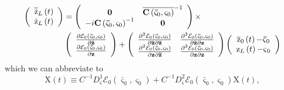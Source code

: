 \documentclass[aps,preprint]{revtex4}%
\begin{document}
\begin{align}
\left(
\begin{array}
[c]{c}%
\overline{\mathrm{\dot{z}}}_{L}\left(  t\right)  \\
\mathrm{\dot{z}}_{L}\left(  t\right)
\end{array}
\right)    & =\left(
\begin{array}
[c]{cc}%
\mathbf{0} & \overline{\mathbf{C}\left(  \mathbf{\bar{\varsigma}}%
_{0},\mathbf{\varsigma}_{0}\right)  }^{-1}\\
-i\mathbf{C}\left(  \mathbf{\bar{\varsigma}}_{0},\mathbf{\varsigma}%
_{0}\right)  ^{-1} & \mathbf{0}%
\end{array}
\right)  \times\nonumber\\
& \left(
\begin{array}
[c]{c}%
\frac{\partial\mathcal{E}_{0}\left(  \mathbf{\bar{\varsigma}}_{0}%
,\mathbf{\varsigma}_{0}\right)  }{\partial\mathbf{\bar{z}}}\\
\frac{\partial\mathcal{E}_{0}\left(  \mathbf{\bar{\varsigma}}_{0}%
,\mathbf{\varsigma}_{0}\right)  }{\partial\mathbf{z}}%
\end{array}
\right)  +\left(
\begin{array}
[c]{cc}%
\frac{\partial^{2}\mathcal{E}_{0}\left(  \mathbf{\bar{\varsigma}}%
_{0},\mathbf{\varsigma}_{0}\right)  }{\partial\mathbf{\bar{z}}\partial
\mathbf{\bar{z}}} & \frac{\partial^{2}\mathcal{E}_{0}\left(  \mathbf{\bar
{\varsigma}}_{0},\mathbf{\varsigma}_{0}\right)  }{\partial\mathbf{\bar{z}%
}\partial\mathbf{z}}\\
\frac{\partial^{2}\mathcal{E}_{0}\left(  \mathbf{\bar{\varsigma}}%
_{0},\mathbf{\varsigma}_{0}\right)  }{\partial\mathbf{z}\partial
\mathbf{\bar{z}}} & \frac{\partial^{2}\mathcal{E}_{0}\left(  \mathbf{\bar
{\varsigma}}_{0},\mathbf{\varsigma}_{0}\right)  }{\partial\mathbf{z}%
\partial\mathbf{z}}%
\end{array}
\right)  \left(
\begin{array}
[c]{c}%
\overline{\mathrm{z}}_{0}\left(  t\right)  \mathbf{-\bar{\varsigma}}_{0}\\
\mathrm{z}_{L}\left(  t\right)  \mathbf{-\varsigma}_{0}%
\end{array}
\right)
\end{align}
which we can abbreviate to
\begin{equation}
\mathrm{\dot{X}}\left(  t\right)  \equiv C^{-1}D_{\mathbf{\varsigma}}%
^{1}\mathcal{E}_{0}\left(  \mathbf{\bar{\varsigma}}_{0},\mathbf{\varsigma}%
_{0}\right)  +C^{-1}D_{\mathbf{\varsigma}}^{2}\mathcal{E}_{0}\left(
\mathbf{\bar{\varsigma}}_{0},\mathbf{\varsigma}_{0}\right)  \mathrm{X}\left(
t\right)  ,
\end{equation}
\end{document}
